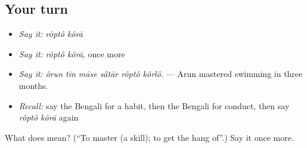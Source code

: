 \subsection*{Your turn}
\begin{itemize}
\raggedright
  \item \emph{Say it:} \emph{rôptô kôrā}
  \item \emph{Say it:} \emph{rôptô kôrā}, once more
  \item \emph{Say it:} \emph{ôrun tin māse sā̃tār rôptô kôrlô.} — Arun mastered swimming in three months.
  \item \emph{Recall:} say the Bengali for a habit, then the Bengali for conduct, then say \emph{rôptô kôrā} again
\end{itemize}

\begin{tcolorbox}[breakable,colback=teal!4,colframe=teal!35!black,title={Before you move on}]
What does   mean? (\textquotedblleft{}To master (a skill); to get the hang of\textquotedblright{}.) Say it once more.
\end{tcolorbox}
